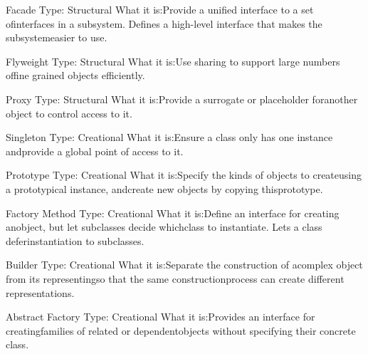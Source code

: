 Facade
Type: Structural
What it is:Provide a unified interface to a set ofinterfaces in a subsystem. Defines a high-level interface that makes the subsystemeasier to use.

Flyweight
Type: Structural
What it is:Use sharing to support large numbers offine grained objects efficiently.

Proxy
Type: Structural
What it is:Provide a surrogate or placeholder foranother object to control access to it.

Singleton
Type: Creational
What it is:Ensure a class only has one instance andprovide a global point of access to it.

Prototype
Type: Creational
What it is:Specify the kinds of objects to createusing a prototypical instance, andcreate new objects by copying thisprototype.

Factory Method
Type: Creational
What it is:Define an interface for creating anobject, but let subclasses decide whichclass to instantiate. Lets a class deferinstantiation to subclasses.

Builder
Type: Creational
What it is:Separate the construction of acomplex object from its representingso that the same constructionprocess can create different representations.

Abstract Factory
Type: Creational
What it is:Provides an interface for creatingfamilies of related or dependentobjects without specifying their concrete class.



\fi

